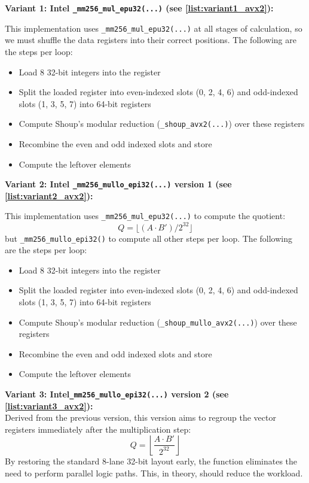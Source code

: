 \documentclass{article}
\newcommand{\pointlabel}[1]{\par\smallskip\noindent\textbf{\textcolor{accentorange}{#1:}} }
\begin{document}
\pointlabel{Variant 1: Intel \texttt{\_mm256\_mul\_epu32(...)} (see \autoref{list:variant1_avx2})}

This implementation uses \texttt{\_mm256\_mul\_epu32(...)} at all stages of calculation, so we must shuffle the data registers into their correct positions. The following are the steps per loop:

\begin{itemize}
    \item Load 8 32-bit integers into the register
    \item Split the loaded register into even-indexed slots (0, 2, 4, 6) and odd-indexed slots (1, 3, 5, 7) into 64-bit registers
    \item Compute Shoup's modular reduction (\texttt{\_shoup\_avx2(...)}) over these registers
    \item Recombine the even and odd indexed slots and store
    \item Compute the leftover elements
\end{itemize}

\pointlabel{Variant 2: Intel \texttt{\_mm256\_mullo\_epi32(...)} version 1 (see \autoref{list:variant2_avx2})}

This implementation uses \texttt{\_mm256\_mul\_epu32(...)} to compute the quotient:
\[Q = \lfloor (A \cdot B') / 2^{32} \rfloor\]
but \texttt{\_mm256\_mullo\_epi32()} to compute all other steps per loop. The following are the steps per loop:
\begin{itemize}
    \item Load 8 32-bit integers into the register
    \item Split the loaded register into even-indexed slots (0, 2, 4, 6) and odd-indexed slots (1, 3, 5, 7) into 64-bit registers
    \item Compute Shoup's modular reduction (\texttt{\_shoup\_mullo\_avx2(...)}) over these registers
    \item Recombine the even and odd indexed slots and store
    \item Compute the leftover elements
\end{itemize}


\pointlabel{Variant 3: Intel\texttt{\_mm256\_mullo\_epi32(...)} version 2 (see \autoref{list:variant3_avx2})} \\
Derived from the previous version, this version aims to regroup the vector registers immediately after the
multiplication step:
\[Q = \left\lfloor \frac{A \cdot B'}{2^{32}}   \right\rfloor\]
By restoring the standard 8-lane 32-bit layout early, the function eliminates the need to perform parallel logic paths.
This, in theory, should reduce the workload.
\end{document}
